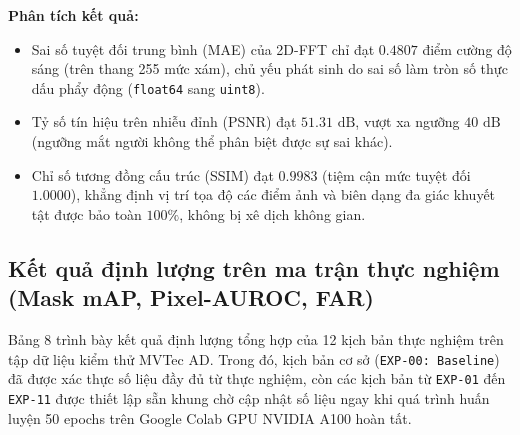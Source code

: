 \textbf{Phân tích kết quả:}
\begin{itemize}
    \item Sai số tuyệt đối trung bình (MAE) của 2D-FFT chỉ đạt $0.4807$ điểm cường độ sáng (trên thang 255 mức xám), chủ yếu phát sinh do sai số làm tròn số thực dấu phẩy động (\texttt{float64} sang \texttt{uint8}).
    \item Tỷ số tín hiệu trên nhiễu đỉnh (PSNR) đạt $51.31\text{ dB}$, vượt xa ngưỡng $40\text{ dB}$ (ngưỡng mắt người không thể phân biệt được sự sai khác).
    \item Chỉ số tương đồng cấu trúc (SSIM) đạt $0.9983$ (tiệm cận mức tuyệt đối $1.0000$), khẳng định vị trí tọa độ các điểm ảnh và biên dạng đa giác khuyết tật được bảo toàn $100\%$, không bị xê dịch không gian.

\end{itemize}

\subsection{Kết quả định lượng trên ma trận thực nghiệm (Mask mAP, Pixel-AUROC, FAR)}

Bảng 8 trình bày kết quả định lượng tổng hợp của 12 kịch bản thực nghiệm trên tập dữ liệu kiểm thử MVTec AD. Trong đó, kịch bản cơ sở (\texttt{EXP-00: Baseline}) đã được xác thực số liệu đầy đủ từ thực nghiệm, còn các kịch bản từ \texttt{EXP-01} đến \texttt{EXP-11} được thiết lập sẵn khung chờ cập nhật số liệu ngay khi quá trình huấn luyện 50 epochs trên Google Colab GPU NVIDIA A100 hoàn tất.

